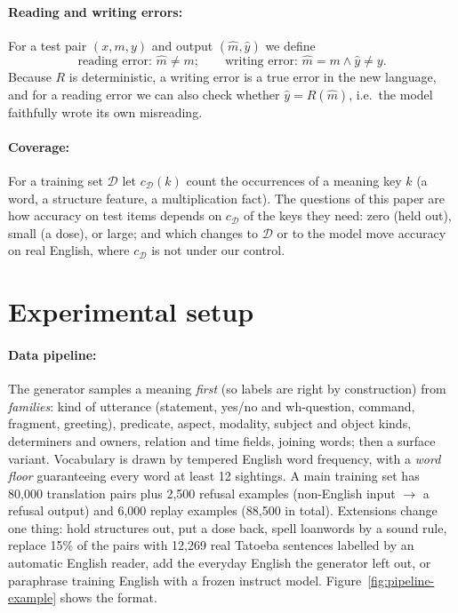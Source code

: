\documentclass{article} %
\begin{document}
\paragraph{Reading and writing errors:} For a test pair $(x, m, y)$ and output $(\hat m, \hat y)$ we define
\begin{equation}
\text{reading error: } \hat m \neq m; \qquad \text{writing error: } \hat m = m \wedge \hat y \neq y .
\end{equation}
Because $R$ is deterministic, a writing error is a true error in the new language, and for a reading error we can
also check whether $\hat y = R(\hat m)$, i.e.\ the model faithfully wrote its own misreading.

\paragraph{Coverage:} For a training set $\mathcal{D}$ let $c_\mathcal{D}(k)$ count the occurrences of a meaning key
$k$ (a word, a structure feature, a multiplication fact). The questions of this paper are how accuracy on test items
depends on $c_\mathcal{D}$ of the keys they need: zero (held out), small (a dose), or large; and which changes to
$\mathcal{D}$ or to the model move accuracy on real English, where $c_\mathcal{D}$ is not under our control.

\section{Experimental setup}\label{sec:setup}

\paragraph{Data pipeline:} The generator samples a meaning \emph{first} (so labels are right by construction) from
\emph{families}: kind of utterance (statement, yes/no and wh-question, command, fragment, greeting), predicate,
aspect, modality, subject and object kinds, determiners and owners, relation and time fields, joining words; then a
surface variant. Vocabulary is drawn by tempered English word frequency, with a \emph{word floor} guaranteeing every
word at least 12 sightings. A main training set has 80,000 translation pairs plus 2,500 refusal examples
(non-English input $\rightarrow$ a refusal output) and 6,000 replay examples (88,500 in total). Extensions change
one thing: hold structures out, put a dose back, spell loanwords by a sound rule, replace 15\% of the pairs with
12,269 real Tatoeba sentences labelled by an automatic English reader, add the everyday English the generator left
out, or paraphrase training English with a frozen instruct model. Figure~\ref{fig:pipeline-example} shows the
format.
\end{document}
